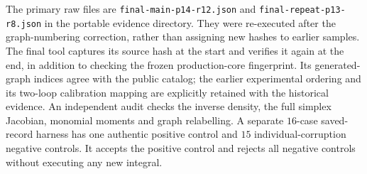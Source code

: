 The primary raw files are
\texttt{final-main-p14-r12.json} and
\texttt{final-repeat-p13-r8.json} in the portable evidence directory.
They were re-executed after the graph-numbering correction, rather than
assigning new hashes to earlier samples.  The final tool captures its
source hash at the start and verifies it again at the end, in addition to
checking the frozen production-core fingerprint.  Its generated-graph
indices agree with the public catalog; the earlier experimental ordering
and its two-loop calibration mapping are explicitly retained with the
historical evidence.  An independent audit checks the inverse density,
the full simplex Jacobian, monomial moments and graph relabelling.  A
separate $16$-case saved-record harness has one authentic positive control
and $15$ individual-corruption negative controls.  It accepts the positive
control and rejects all negative controls without executing any new integral.
